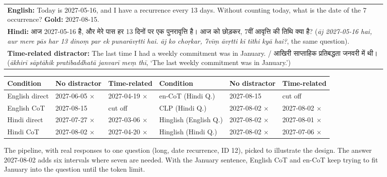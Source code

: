\documentclass[11pt]{article}
\newcommand{\hi}[1]{\foreignlanguage{hindi}{#1}}
\newcommand{\ok}{\checkmark}
\newcommand{\no}{$\times$}
\begin{document}
\begin{figure}[t]
\centering
{}

\vspace{4pt}
\begin{tabularx}{\textwidth}{@{}X@{}}
\textbf{English:} Today is 2027-05-16, and I have a recurrence every 13 days. Without counting today, what is the date of the 7 occurrence? \textbf{Gold:} 2027-08-15.\\
\textbf{Hindi:} \hi{आज 2027-05-16 है, और मेरे पास हर 13 दिनों पर एक पुनरावृत्ति है। आज को छोड़कर, 7वीं आवृत्ति की तिथि क्या है?} (\emph{āj 2027-05-16 hai, aur mere pās har 13 dinoṃ par ek punarāvṛtti hai. āj ko choṛkar, 7vīṃ āvṛtti kī tithi kyā hai?}, the same question).\\
\textbf{Time-related distractor:} The last time I had a weekly commitment was in January. / \hi{आखिरी साप्ताहिक प्रतिबद्धता जनवरी में थी।} (\emph{ākhirī sāptāhik pratibaddhatā janvarī meṃ thī}, `The last weekly commitment was in January.')\\
\end{tabularx}

\vspace{2pt}
\setlength{\tabcolsep}{3pt}
\begin{tabular}{@{}lll@{\hspace{0.6em}}lll@{}}
\toprule
Condition & No distractor & Time-related & Condition & No distractor & Time-related \\
\midrule
English direct & 2027-06-05 \no & 2027-04-19 \no & en-CoT (Hindi Q.) & 2027-08-15 \ok & cut off \\
English CoT & 2027-08-15 \ok & cut off & CLP (Hindi Q.) & 2027-08-02 \no & 2027-08-02 \no \\
Hindi direct & 2027-07-27 \no & 2027-03-06 \no & Hinglish (English Q.) & 2027-08-02 \no & 2027-08-01 \no \\
Hindi CoT & 2027-08-02 \no & 2027-04-20 \no & Hinglish (Hindi Q.) & 2027-08-02 \no & 2027-07-06 \no \\
\bottomrule
\end{tabular}
\caption{The pipeline, with real responses to one question (long, date recurrence, ID 12), picked to illustrate the design. The answer 2027-08-02 adds six intervals where seven are needed. With the January sentence, English CoT and en-CoT keep trying to fit January into the question until the token limit.}
\label{fig:design}
\end{figure}
\end{document}
